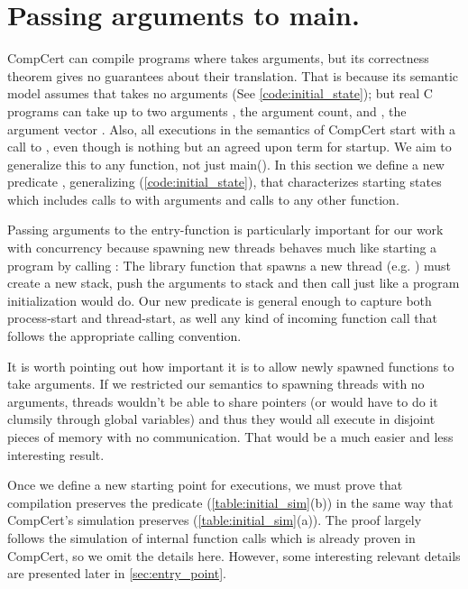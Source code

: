 \section{Passing arguments to main.}\label{sec:premain}

CompCert can compile programs where  takes arguments, but its correctness theorem gives no guarantees about their translation. That is because its semantic model assumes that  takes no arguments (See \autoref{code:initial_state}); but real C programs can take up to two arguments , the argument count, and , the argument vector%
. Also, all executions in the semantics of CompCert start with a call to , even though  is nothing but an agreed upon term for startup. We aim to generalize this to any function, not just main(). In this section we define a new predicate , generalizing  (\autoref{code:initial_state}), that characterizes starting states which includes calls to  with arguments and calls to any other function.

Passing arguments to the entry-function is particularly important for our work with concurrency because spawning new threads behaves much like starting a program by calling : The library function that spawns a new thread (e.g. ) must create a new stack, push the arguments to stack and then call  just like a program initialization would do. Our new predicate  is general enough to capture both process-start and thread-start, as well any kind of incoming function call that follows the appropriate calling convention.

It is worth pointing out how important it is to allow newly spawned functions to take arguments. If we restricted our semantics to spawning threads with no arguments, threads wouldn't be able to share pointers (or would have to do it clumsily through global variables) and thus they would all execute in disjoint pieces of memory with no communication. That would be a much easier and less interesting result. 

Once we define a new starting point for executions, we must prove that compilation preserves the predicate  (\autoref{table:initial_sim}(b)) in the same way that CompCert's simulation preserves  (\autoref{table:initial_sim}(a)). The proof largely follows the simulation of internal function calls which is already proven in CompCert, so we omit the details here. However, some interesting relevant details are presented later in \autoref{sec:entry_point}.

